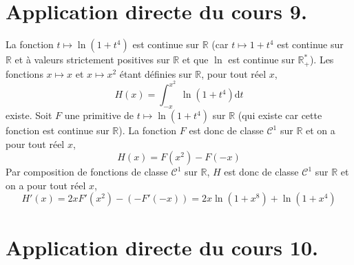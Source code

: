 \documentclass[french,11pt,twoside]{VcCours}
\newcommand{\dt}{\text{d}t}
\begin{document}
\medskip

\section*{Application directe du cours 9.}

La fonction $t \mapsto \ln(1+t^4)$ est continue sur $\mathbb{R}$ (car $t \mapsto 1+t^4$ est continue sur $\mathbb{R}$ et à valeurs strictement positives sur $\mathbb{R}$ et que $\ln$ est continue sur $\mathbb{R}_+^{*}$). Les fonctions $x \mapsto x$ et $x \mapsto x^2$ étant définies sur $\mathbb{R}$, pour tout réel $x$,
$$ H(x) = \int_{-x}^{x^2} \ln(1+t^4) \dt$$
existe. Soit $F$ une primitive de $t \mapsto \ln(1+t^4)$ sur $\mathbb{R}$ (qui existe car cette fonction est continue sur $\mathbb{R}$). La fonction $F$ est donc de classe $\mathcal{C}^1$ sur $\mathbb{R}$ et on a pour tout réel $x$,
$$ H(x) = F(x^2)-F(-x)$$
Par composition de fonctions de classe $\mathcal{C}^1$ sur $\mathbb{R}$, $H$ est donc de classe $\mathcal{C}^1$ sur $\mathbb{R}$ et on a pour tout réel $x$,
$$ H'(x) = 2x F'(x^2)-(-F'(-x)) = 2x \ln(1+x^8)+ \ln(1+x^4)$$

\medskip

\section*{Application directe du cours 10.}
\end{document}
